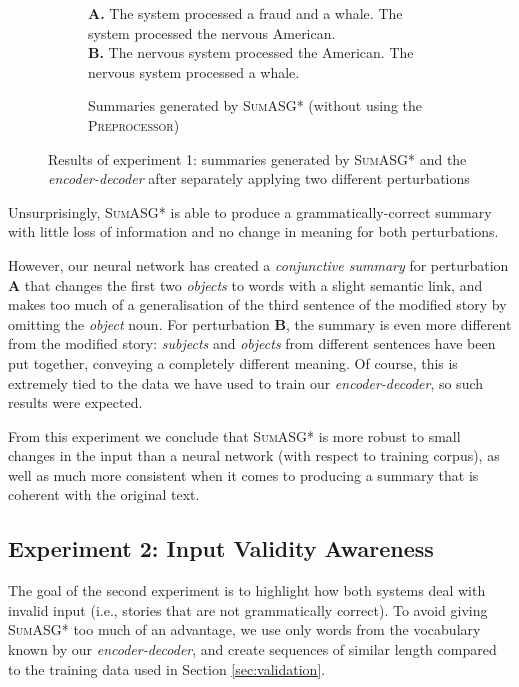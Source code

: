 \begin{figure}[H]
\begin{subfigure}{\textwidth}
\begin{displayquote}
\textbf{A.} The system processed a fraud and a whale. The system processed the nervous American. \\
\textbf{B.} The nervous system processed the American. The nervous system processed a whale.
\end{displayquote}
\caption{Summaries generated by \textsc{SumASG*} (without using the \textsc{Preprocessor})}
\end{subfigure}
\caption{Results of experiment 1: summaries generated by \textsc{SumASG*} and the \textit{encoder-decoder} after separately applying two different perturbations}
\label{fig:experiment_1}
\end{figure}

\noindent
Unsurprisingly, \textsc{SumASG*} is able to produce a grammatically-correct summary with little loss of information and no change in meaning for both perturbations.

However, our neural network has created a \textit{conjunctive summary} for perturbation \textbf{A} that changes the first two \textit{objects} to words with a slight semantic link, and makes too much of a generalisation of the third sentence of the modified story by omitting the \textit{object} noun. For perturbation \textbf{B}, the summary is even more different from the modified story: \textit{subjects} and \textit{objects} from different sentences have been put together, conveying a completely different meaning. Of course, this is extremely tied to the data we have used to train our \textit{encoder-decoder}, so such results were expected.

From this experiment we conclude that \textsc{SumASG*} is more robust to small changes in the input than a neural network (with respect to training corpus), as well as much more consistent when it comes to producing a summary that is coherent with the original text.

\subsection{Experiment 2: Input Validity Awareness}
\label{subsec:experiment_2}

The goal of the second experiment is to highlight how both systems deal with invalid input (i.e., stories that are not grammatically correct). To avoid giving \textsc{SumASG*} too much of an advantage, we use only words from the vocabulary known by our \textit{encoder-decoder}, and create sequences of similar length compared to the training data used in Section \ref{sec:validation}.


